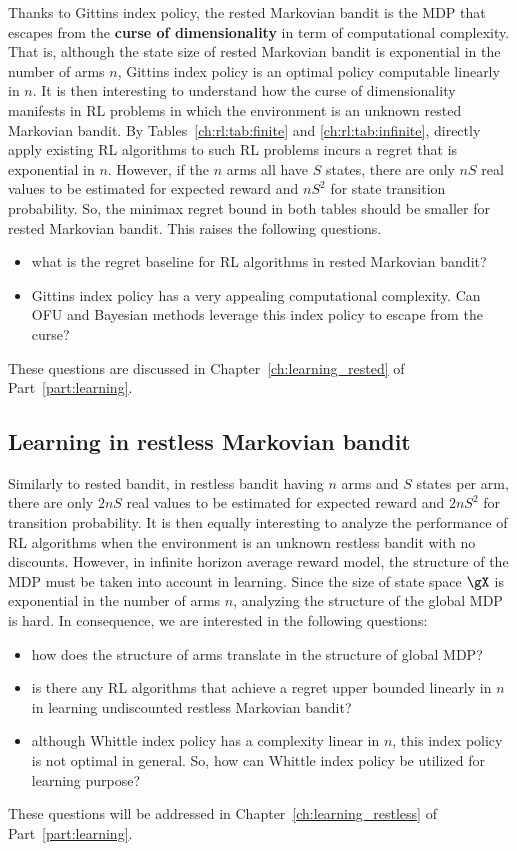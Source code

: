 Thanks to Gittins index policy, the rested Markovian bandit is the MDP that escapes from the \textbf{curse of dimensionality} in term of computational complexity.
That is, although the state size of rested Markovian bandit is exponential in the number of arms $n$, Gittins index policy is an optimal policy computable linearly in $n$.
It is then interesting to understand how the curse of dimensionality manifests in RL problems in which the environment is an unknown rested Markovian bandit.
By Tables~\ref{ch:rl:tab:finite} and \ref{ch:rl:tab:infinite}, directly apply existing RL algorithms to such RL problems incurs a regret that is exponential in $n$.
However, if the $n$ arms all have $S$ states, there are only $nS$ real values to be estimated for expected reward and $nS^2$ for state transition probability.
So, the minimax regret bound in both tables should be smaller for rested Markovian bandit.
This raises the following questions.
\begin{itemize}
    \item what is the regret baseline for RL algorithms in rested Markovian bandit?
    \item Gittins index policy has a very appealing computational complexity. Can OFU and Bayesian methods leverage this index policy to escape from the curse?
\end{itemize}
These questions are discussed in Chapter~\ref{ch:learning_rested} of Part~\ref{part:learning}.

\subsection{Learning in restless Markovian bandit}

Similarly to rested bandit, in restless bandit having $n$ arms and $S$ states per arm, there are only $2nS$ real values to be estimated for expected reward and $2nS^2$ for transition probability.
It is then equally interesting to analyze the performance of RL algorithms when the environment is an unknown restless bandit with no discounts.
However, in infinite horizon average reward model, the structure of the MDP must be taken into account in learning.
Since the size of state space $\gX$ is exponential in the number of arms $n$, analyzing the structure of the global MDP is hard.
In consequence, we are interested in the following questions:
\begin{itemize}
    \item how does the structure of arms translate in the structure of global MDP?
    \item is there any RL algorithms that achieve a regret upper bounded linearly in $n$ in learning undiscounted restless Markovian bandit?
    \item although Whittle index policy has a complexity linear in $n$, this index policy is not optimal in general. So, how can Whittle index policy be utilized for learning purpose?
\end{itemize}
These questions will be addressed in Chapter~\ref{ch:learning_restless} of Part~\ref{part:learning}.

\endgroup
